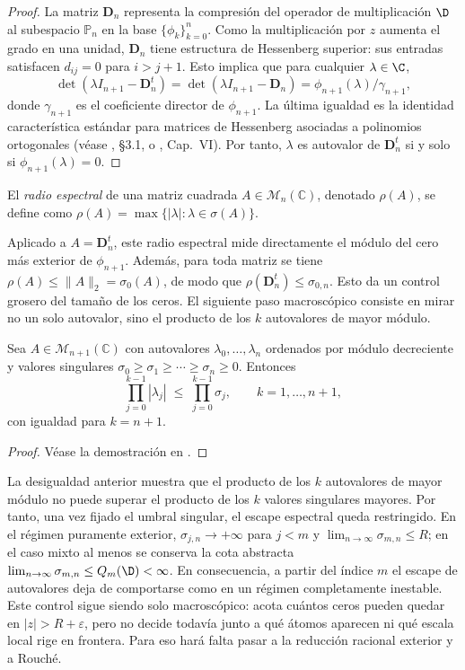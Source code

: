 \begin{proof}
	La matriz $\mathbf{D}_n$ representa la compresión del operador de multiplicación $\D$ al subespacio $\mathbb P_n$ en la base $\{\phi_k\}_{k=0}^n$. Como la multiplicación por $z$ aumenta el grado en una unidad, $\mathbf{D}_n$ tiene estructura de Hessenberg superior: sus entradas satisfacen $d_{ij}=0$ para $i>j+1$. Esto implica que para cualquier $\lambda\in\C$,
	\[
		\det(\lambda I_{n+1}-\mathbf{D}_n^t)=\det(\lambda I_{n+1}-\mathbf{D}_n)
		=\phi_{n+1}(\lambda)/\gamma_{n+1},
	\]
	donde $\gamma_{n+1}$ es el coeficiente director de $\phi_{n+1}$. La última igualdad es la identidad característica estándar para matrices de Hessenberg asociadas a polinomios ortogonales (véase \cite{szego1975orthogonal}, §3.1, o \cite{gohberg1969introduction}, Cap.~VI). Por tanto, $\lambda$ es autovalor de $\mathbf{D}_n^t$ si y solo si $\phi_{n+1}(\lambda)=0$.
\end{proof}

\begin{defn}\label{def:radio_espectral}
	El \emph{radio espectral} de una matriz cuadrada $A \in \mathcal{M}_n(\mathbb{C})$, denotado $\rho(A)$, se define como $\rho(A)=\max\{|\lambda| : \lambda \in \sigma(A)\}$.
\end{defn}

Aplicado a $A=\mathbf D_n^t$, este radio espectral mide directamente el módulo del cero más exterior de $\phi_{n+1}$. Además, para toda matriz se tiene $\rho(A)\le \|A\|_2=\sigma_0(A)$, de modo que $\rho(\mathbf D_n^t)\le \sigma_{0,n}$.
Esto da un control grosero del tamaño de los ceros. El siguiente paso macroscópico consiste en mirar no un solo autovalor, sino el producto de los $k$ autovalores de mayor módulo.

\begin{lem}\label{lem:weyl_horn}
	Sea $A\in\mathcal{M}_{n+1}(\mathbb{C})$ con autovalores $\lambda_0,\dots,\lambda_n$
	ordenados por módulo decreciente y valores singulares
	$\sigma_0\ge\sigma_1\ge\cdots\ge\sigma_n\ge 0$. Entonces
	\[
		\prod_{j=0}^{k-1}|\lambda_j|\;\le\;\prod_{j=0}^{k-1}\sigma_j,
		\qquad k=1,\dots,n+1,
	\]
	con igualdad para $k=n+1$.
\end{lem}

\begin{proof}
	Véase la demostración en \cite[Sec.~3.3]{horn2012matrix}.
\end{proof}

La desigualdad anterior muestra que el producto de los $k$ autovalores de mayor módulo no puede superar el producto de los $k$ valores singulares mayores. Por tanto, una vez fijado el umbral singular, el escape espectral queda restringido. En el régimen puramente exterior, $\sigma_{j,n}\to +\infty$ para $j<m$ y $\lim_{n\to\infty}\sigma_{m,n}\le R$; en el caso mixto al menos se conserva la cota abstracta $\lim_{n\to\infty}\sigma_{m,n}\le Q_m(\D)<\infty$.
En consecuencia, a partir del índice $m$ el escape de autovalores deja de comportarse como en un régimen completamente inestable. Este control sigue siendo solo macroscópico: acota cuántos ceros pueden quedar en $|z|>R+\varepsilon$, pero no decide todavía junto a qué átomos aparecen ni qué escala local rige en frontera. Para eso hará falta pasar a la reducción racional exterior y a Rouché.

